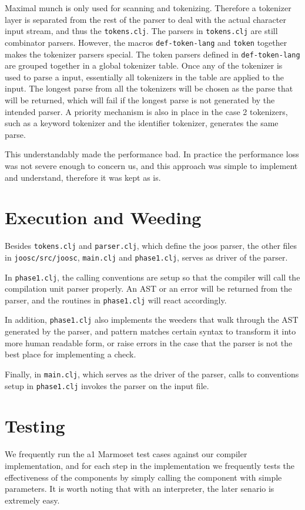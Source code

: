 \documentclass[12pt]{article}
\begin{document}
Maximal munch is only used for scanning and tokenizing. Therefore a tokenizer
layer is separated from the rest of the parser to deal with the actual character
input stream, and thus the \texttt{tokens.clj}. The parsers in
\texttt{tokens.clj} are still combinator parsers. However, the macros
\texttt{def-token-lang} and \texttt{token} together makes the tokenizer parsers
special. The token parsers defined in \texttt{def-token-lang} are grouped
together in a global tokenizer table. Once any of the tokenizer is used to parse
a input, essentially all tokenizers in the table are applied to the input. The
longest parse from all the tokenizers will be chosen as the parse that will be
returned, which will fail if the longest parse is not generated by the intended
parser. A priority mechanism is also in place in the case 2 tokenizers, such as
a keyword tokenizer and the identifier tokenizer, generates the same parse.

This understandably made the performance bad. In practice the performance loss
was not severe enough to concern us, and this approach was simple to implement
and understand, therefore it was kept as is.

\section{Execution and Weeding}

Besides \texttt{tokens.clj} and \texttt{parser.clj}, which define the joos
parser, the other files in \texttt{joosc/src/joosc}, \texttt{main.clj} and
\texttt{phase1.clj}, serves as driver of the parser.

In \texttt{phase1.clj}, the calling conventions are setup so that the compiler
will call the compilation unit parser properly. An AST or an error will be
returned from the parser, and the routines in \texttt{phase1.clj} will react
accordingly.

In addition, \texttt{phase1.clj} also implements the weeders that walk through
the AST generated by the parser, and pattern matches certain syntax to transform
it into more human readable form, or raise errors in the case that the parser is
not the best place for implementing a check.

Finally, in \texttt{main.clj}, which serves as the driver of the parser, calls to
conventions setup in \texttt{phase1.clj} invokes the parser on the input file.

\section{Testing}

We frequently run the a1 Marmoset test cases against our compiler
implementation, and for each step in the implementation we frequently tests the
effectiveness of the components by simply calling the component with simple
parameters. It is worth noting that with an interpreter, the later senario is
extremely easy.
\end{document}
